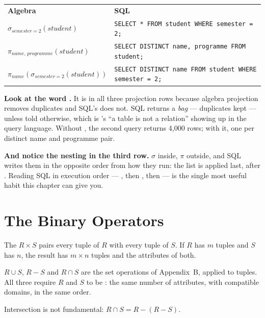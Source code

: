 \begin{examplebox}
\begin{tabular}{@{}L{5.6cm}L{8.4cm}@{}}
\textbf{Algebra} & \textbf{SQL} \\
$\sigma_{\mathit{semester}=2}(\mathit{student})$ &
  \texttt{SELECT * FROM student WHERE semester = 2;} \\
$\pi_{\mathit{name},\,\mathit{programme}}(\mathit{student})$ &
  \texttt{SELECT DISTINCT name, programme FROM student;} \\
$\pi_{\mathit{name}}(\sigma_{\mathit{semester}=2}(\mathit{student}))$ &
  \texttt{SELECT DISTINCT name FROM student WHERE semester = 2;} \\
\end{tabular}

\smallskip
\textbf{Look at the word .} It is in all three projection rows
because algebra projection removes duplicates and SQL's does not. SQL returns
a \emph{bag} --- duplicates kept --- unless told otherwise, which is
's ``a table is not a relation'' showing up in the query
language. Without , the second query returns 4{,}000 rows; with
it, one per distinct name and programme pair.

\smallskip
\textbf{And notice the nesting in the third row.} $\sigma$ inside, $\pi$
outside, and SQL writes them in the opposite order from how they run: the
 list is applied last, after . Reading SQL in
execution order --- , then , then  --- is
the single most useful habit this chapter can give you.
\end{examplebox}

\section{The Binary Operators}

\begin{definitionbox}
The  $R \times S$ pairs every tuple of $R$ with every
tuple of $S$. If $R$ has $m$ tuples and $S$ has $n$, the result has
$m \times n$ tuples and the attributes of both.

\smallskip
{} $R \cup S$,  $R - S$ and 
$R \cap S$ are the set operations of Appendix~B, applied to tuples. All three
require $R$ and $S$ to be : the same number of
attributes, with compatible domains, in the same order.

\smallskip
Intersection is not fundamental: $R \cap S = R - (R - S)$.
\end{definitionbox}

